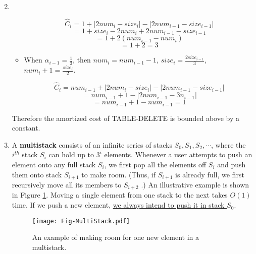 \documentclass[12pt,a4paper]{article}
\makeatletter
\newtheorem*{solution}{Solution}
\theoremstyle{definition}
\renewenvironment{solution}[1][Solution] {\par\pushQED{\qed}\normalfont\topsep6\p@\@plus6\p@\relax\trivlist\item[\hskip\labelsep\bfseries#1\@addpunct{.}]\ignorespaces}{\popQED\endtrivlist\@endpefalse} \makeatother
\makeatother
\begin{document}
\begin{enumerate}
\begin{solution}
\begin{itemize}
			    \begin{equation}
			        \hat{C}_i=1+|2num_i-size_i|-|2num_{i-1}-size_{i-1}|
			    \end{equation}
			    \begin{equation*}
			        =1+size_i-2num_i+2num_{i-1}-size_{i-1}
			    \end{equation*}
			    \begin{equation*}
			        =1+2(num_{i-1}-num_i)
			    \end{equation*}
			    \begin{equation*}
			        =1+2=3
			    \end{equation*}
			\item 
			    When $\alpha_{i-1}=\frac{1}{3}$, then $num_i=num_{i-1}-1$, $size_i=\frac{2size_{i-1}}{3}$, $num_i+1=\frac{size_i}{2}$.
			    
			    \begin{equation*}
			        \hat{C}_i=num_{i-1}+|2num_i-size_i|-|2num_{i-1}-size_{i-1}|
			    \end{equation*}
			    \begin{equation*}
			        =num_{i-1}+1-|2num_{i-1}-3n_{i-1}|
			    \end{equation*}
			    \begin{equation*}
			        =num_{i-1}+1-num_{i-1}=1
			    \end{equation*}
		\end{itemize}
	
	    Therefore the amortized cost of TABLE-DELETE is bounded above by a constant.
	\end{solution}
	
	\item A \textbf{multistack} consists of an infinite series of stacks $S_0, S_1, S_2,\cdots$, where the $i^{th}$ stack $S_i$ can hold up to $3^i$ elements. Whenever a user attempts to push an element onto any full stack $S_i$, we first pop all the elements off $S_i$ and push them onto stack $S_{i+1}$ to make room. (Thus, if $S_{i+1}$ is already full, we first recursively move all its members to $S_{i+2}$ .) An illustrative example is shown in Figure \ref{Fig-MultiStack}. Moving a single element from one stack to the next takes $O(1)$ time. If we push a new element, \underline{we always intend to push it in stack $S_0$}.

	\begin{figure}[!htbp]
	\centering
	\texttt{[image: Fig-MultiStack.pdf]}
	\caption{An example of making room for one new element in a multistack.}
	\label{Fig-MultiStack}
	\end{figure}


\end{enumerate}
\end{document}
